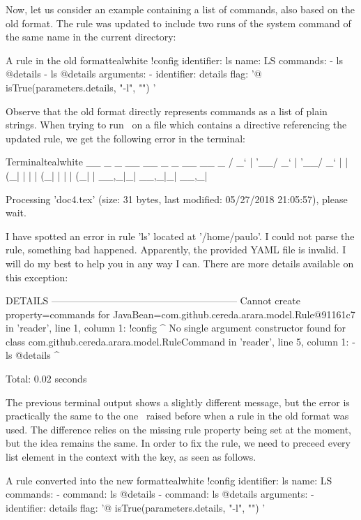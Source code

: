 Now, let us consider an example containing a list of commands, also based on the old format. The  rule was updated to include two runs of the system command of the same name in the current directory:

\begin{codebox}{A rule in the old format}{teal}{\icnote}{white}
!config
identifier: ls
name: LS
commands:
- ls @{details}
- ls @{details}
arguments:
- identifier: details
  flag: '@{ isTrue(parameters.details, "-l", "") }'
\end{codebox}

Observe that the old format directly represents commands as a list of plain strings. When trying to run \arara\ on a file which contains a directive referencing the updated  rule, we get the following error in the terminal:

\begin{codebox}{Terminal}{teal}{\icnote}{white}
  __ _ _ __ __ _ _ __ __ _ 
 / _` | '__/ _` | '__/ _` |
| (_| | | | (_| | | | (_| |
 \__,_|_|  \__,_|_|  \__,_|

Processing 'doc4.tex' (size: 31 bytes, last modified: 05/27/2018
21:05:57), please wait.

I have spotted an error in rule 'ls' located at '/home/paulo'. I
could not parse the rule, something bad happened. Apparently, the
provided YAML file is invalid. I will do my best to help you in
any way I can. There are more details available on this
exception:

DETAILS ---------------------------------------------------------
Cannot create property=commands for
JavaBean=com.github.cereda.arara.model.Rule@91161c7
 in 'reader',
line 1, column 1:
    !config
    ^
No single argument
constructor found for class
com.github.cereda.arara.model.RuleCommand
 in 'reader', line 5,
column 1:
    - ls @{details}
    ^


Total: 0.02 seconds
\end{codebox}

The previous terminal output shows a slightly different message, but the error is practically the same to the one \arara\ raised before when a rule in the old format was used. The difference relies on the missing rule property being set at the moment, but the idea remains the same. In order to fix the rule, we need to preceed every list element in the  context with the  key, as seen as follows.

\begin{codebox}{A rule converted into the new format}{teal}{\icnote}{white}
!config
identifier: ls
name: LS
commands:
- command: ls @{details}
- command: ls @{details}
arguments:
- identifier: details
  flag: '@{ isTrue(parameters.details, "-l", "") }'
\end{codebox}


